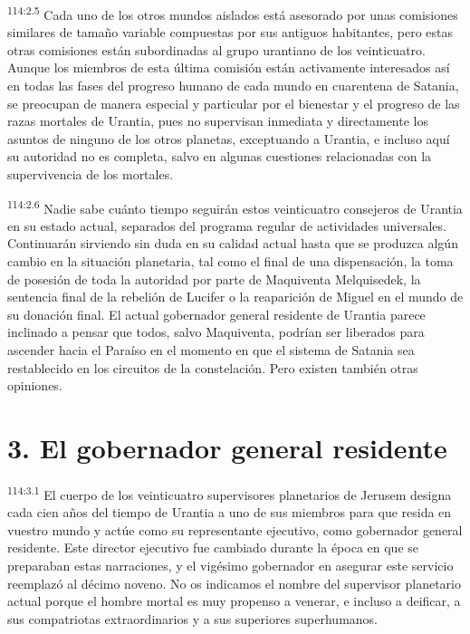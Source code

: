 \documentclass[twoside, 11pt]{book}
\begin{document}
\par
\textsuperscript{114:2.5} Cada uno de los otros mundos aislados está asesorado por unas comisiones similares de tamaño variable compuestas por sus antiguos habitantes, pero estas otras comisiones están subordinadas al grupo urantiano de los veinticuatro. Aunque los miembros de esta última comisión están activamente interesados así en todas las fases del progreso humano de cada mundo en cuarentena de Satania, se preocupan de manera especial y particular por el bienestar y el progreso de las razas mortales de Urantia, pues no supervisan inmediata y directamente los asuntos de ninguno de los otros planetas, exceptuando a Urantia, e incluso aquí su autoridad no es completa, salvo en algunas cuestiones relacionadas con la supervivencia de los mortales.

\par
\textsuperscript{114:2.6} Nadie sabe cuánto tiempo seguirán estos veinticuatro consejeros de Urantia en su estado actual, separados del programa regular de actividades universales. Continuarán sirviendo sin duda en su calidad actual hasta que se produzca algún cambio en la situación planetaria, tal como el final de una dispensación, la toma de posesión de toda la autoridad por parte de Maquiventa Melquisedek, la sentencia final de la rebelión de Lucifer o la reaparición de Miguel en el mundo de su donación final. El actual gobernador general residente de Urantia parece inclinado a pensar que todos, salvo Maquiventa, podrían ser liberados para ascender hacia el Paraíso en el momento en que el sistema de Satania sea restablecido en los circuitos de la constelación. Pero existen también otras opiniones.

\section*{3. El gobernador general residente}
\par
\textsuperscript{114:3.1} El cuerpo de los veinticuatro supervisores planetarios de Jerusem designa cada cien años del tiempo de Urantia a uno de sus miembros para que resida en vuestro mundo y actúe como su representante ejecutivo, como gobernador general residente. Este director ejecutivo fue cambiado durante la época en que se preparaban estas narraciones, y el vigésimo gobernador en asegurar este servicio reemplazó al décimo noveno. No os indicamos el nombre del supervisor planetario actual porque el hombre mortal es muy propenso a venerar, e incluso a deificar, a sus compatriotas extraordinarios y a sus superiores superhumanos.
\end{document}
